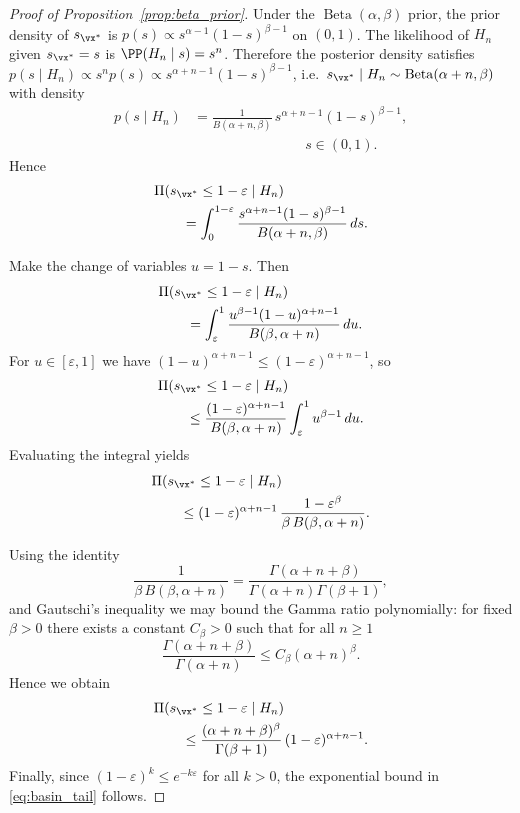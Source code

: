 \propBetaPrior*
{}\label{proof:beta_prior}
\begin{proof}[Proof of Proposition~\ref{prop:beta_prior}]
Under the $\operatorname{Beta}(\alpha,\beta)$ prior, the prior density of $s_{\vx^*}$ is
$p(s)\propto s^{\alpha-1}(1-s)^{\beta-1}$ on $(0,1)$.
The likelihood of $H_n$ given $s_{\vx^*}=s$ is $\PP(H_n\mid s)=s^n$.
Therefore the posterior density satisfies
$p(s\mid H_n)\propto s^n p(s)\propto s^{\alpha+n-1}(1-s)^{\beta-1}$, i.e.\
$s_{\vx^*}\mid H_n\sim\operatorname{Beta}(\alpha+n,\beta)$ with density
\[
\begin{aligned}
p(s\mid H_n)
&=\frac{1}{B(\alpha+n,\beta)}\,
s^{\alpha+n-1}(1-s)^{\beta-1},\\
&\hspace{8em}s\in(0,1).
\end{aligned}
\]
Hence
\[
\begin{aligned}
&\Pi\!\left(s_{\vx^*}\le 1-\varepsilon\mid H_n\right)\\
&\qquad=\int_{0}^{1-\varepsilon}
\frac{s^{\alpha+n-1}(1-s)^{\beta-1}}
{B(\alpha+n,\beta)}\,ds.
\end{aligned}
\]

Make the change of variables $u=1-s$. Then
\[
\begin{aligned}
&\Pi\!\left(s_{\vx^*}\le 1-\varepsilon\mid H_n\right)\\
&\qquad=\int_{\varepsilon}^{1}
\frac{u^{\beta-1}(1-u)^{\alpha+n-1}}
{B(\beta,\alpha+n)}\,du.
\end{aligned}
\]
For $u\in[\varepsilon,1]$ we have $(1-u)^{\alpha+n-1}\le (1-\varepsilon)^{\alpha+n-1}$, so
\[
\begin{aligned}
&\Pi\!\left(s_{\vx^*}\le 1-\varepsilon\mid H_n\right)\\
&\qquad\le \frac{(1-\varepsilon)^{\alpha+n-1}}
{B(\beta,\alpha+n)}
\int_{\varepsilon}^{1}u^{\beta-1}\,du.
\end{aligned}
\]
Evaluating the integral yields
\[
\begin{aligned}
&\Pi\!\left(s_{\vx^*}\le 1-\varepsilon\mid H_n\right)\\
&\qquad\le (1-\varepsilon)^{\alpha+n-1}\,
\frac{1-\varepsilon^{\beta}}{\beta\,B(\beta,\alpha+n)}.
\end{aligned}
\]

Using the identity
\[
\frac{1}{\beta\,B(\beta,\alpha+n)}
=\frac{\Gamma(\alpha+n+\beta)}{\Gamma(\alpha+n)\Gamma(\beta+1)},
\]
and Gautschi's inequality \citep{gautschi1959some} we may bound the Gamma ratio polynomially: for fixed
\(\beta>0\) there exists a constant \(C_\beta>0\) such that for all \(n\ge 1\)
\[
\frac{\Gamma(\alpha+n+\beta)}{\Gamma(\alpha+n)}\le C_\beta(\alpha+n)^{\beta}.
\]
Hence we obtain
\[
\begin{aligned}
&\Pi\!\left(s_{\vx^*}\le 1-\varepsilon\mid H_n\right)\\
&\qquad\le \frac{(\alpha+n+\beta)^{\beta}}{\Gamma(\beta+1)}\,
(1-\varepsilon)^{\alpha+n-1}.
\end{aligned}
\]
Finally, since $(1-\varepsilon)^{k}\le e^{-k\varepsilon}$ for all $k>0$,
the exponential bound in \eqref{eq:basin_tail} follows.
\end{proof}

